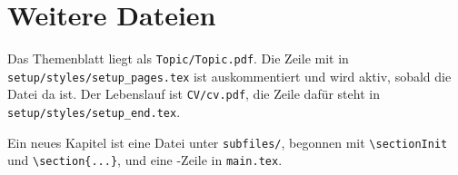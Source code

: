 \documentclass[11pt,a4paper]{article}
\begin{document}
\section*{Weitere Dateien}

Das Themenblatt liegt als \texttt{Topic/Topic.pdf}. Die Zeile mit \verb|| in \texttt{setup/styles/setup\_pages.tex} ist auskommentiert und wird aktiv, sobald die Datei da ist. Der Lebenslauf ist \texttt{CV/cv.pdf}, die Zeile dafür steht in \texttt{setup/styles/setup\_end.tex}.

Ein neues Kapitel ist eine Datei unter \texttt{subfiles/}, begonnen mit \verb|\sectionInit| und \verb|\section{...}|, und eine \verb||-Zeile in \texttt{main.tex}.
\end{document}
